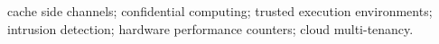 \documentclass[conference]{IEEEtran}
\begin{document}
\begin{IEEEkeywords}
cache side channels; confidential computing; trusted execution environments; intrusion
detection; hardware performance counters; cloud multi-tenancy.
\end{IEEEkeywords}











\end{document}
